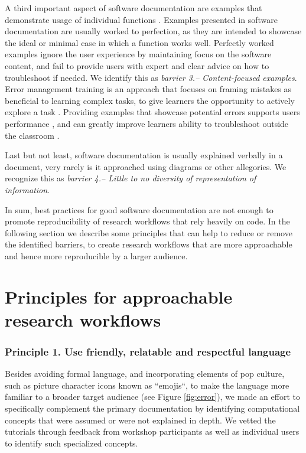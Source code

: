 \documentclass[12pt]{article}
\begin{document}
A third important aspect of software documentation are examples that demonstrate
usage of individual functions \citep{karimzadeh2018top}.
Examples presented in software documentation are usually
worked to perfection, as they are intended to showcase the ideal or minimal case
in which a function works well.
Perfectly worked examples ignore the user experience by
maintaining focus on the software content, and fail to provide users with expert
and clear advice on how to troubleshoot if needed.
We identify this as \textit{barrier 3.-- Content-focused examples}.
Error management training is an approach that focuses on framing mistakes as beneficial
to learning complex tasks, to give learners the opportunity to
actively explore a task \citep{frese1995error}.
Providing examples that showcase potential errors supports users performance \citep{steele2014error},
and can greatly improve learners ability to troubleshoot outside the classroom
\citep{shannon2015live, nederbragt2020ten}.

Last but not least, software documentation is usually explained verbally in a document, very
rarely is it approached using diagrams or other allegories.
We recognize this as \textit{barrier 4.-- Little to no diversity of representation of information}.

In sum, best practices for good software documentation are not enough to promote
reproducibility of research workflows that rely heavily on code. In the following
section we describe some principles that can help to reduce or remove the
identified barriers, to create
research workflows that are more approachable and hence more reproducible by a
larger audience.

\section*{Principles for approachable research workflows}
\label{sec:addressing}

\subsubsection*{Principle 1. Use friendly, relatable and respectful language}


Besides avoiding formal language, and incorporating elements of pop culture, such as picture
character icons known as ``emojis``, to make the language more familiar to a
broader target audience (see Figure \ref{fig:error}), we made an effort to specifically
complement the primary documentation by identifying
computational concepts that were assumed or were not explained in depth.
We vetted the tutorials through feedback from workshop participants as well as
individual users to identify such specialized concepts.
\end{document}

